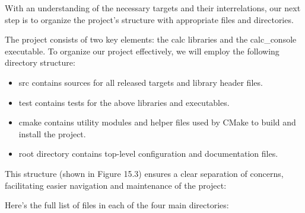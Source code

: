 With an understanding of the necessary targets and their interrelations, our next step is to organize the project’s structure with appropriate files and directories.


The project consists of two key elements: the calc libraries and the calc\_console executable. To organize our project effectively, we will employ the following directory structure:

\begin{itemize}
\item
src contains sources for all released targets and library header files.

\item
test contains tests for the above libraries and executables.

\item
cmake contains utility modules and helper files used by CMake to build and install the project.

\item
root directory contains top-level configuration and documentation files.
\end{itemize}

This structure (shown in Figure 15.3) ensures a clear separation of concerns, facilitating easier navigation and maintenance of the project:


Here’s the full list of files in each of the four main directories:


